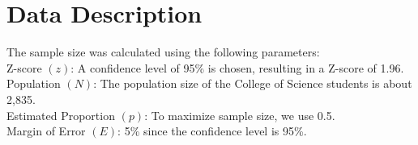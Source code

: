 \documentclass[doublespacing,12pt]{report}
\begin{document}
\section{Data Description}
The sample size was calculated using the following parameters:
\vspace{0.3in}
\\
\vspace{0.1in}
{Z-score} \((z)\): A confidence level of 95\% is chosen, resulting in a Z-score of 1.96.\\
\vspace{0.1in}
{Population} \((N)\): The population size of the College of Science students is about 2,835.\\
\vspace{0.1in}
{Estimated Proportion} \((p)\): To maximize sample size, we use 0.5.\\
\vspace{0.1in}
{Margin of Error} \((E)\): 5\% since the confidence level is 95\%.\\
\end{document}
